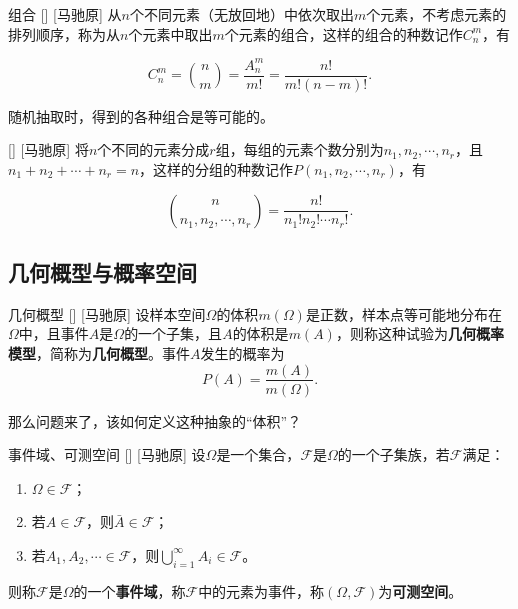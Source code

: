 \documentclass[UTF8]{ctexart}
\begin{document}
        \begin{xmp}
            []
            {组合}
            []
            [马驰原]
            从$n$个不同元素（无放回地）中依次取出$m$个元素，不考虑元素的排列顺序，称为从$n$个元素中取出$m$个元素的组合，这样的组合的种数记作$C_n^m$，有
            
            \[C_n^m=\binom{n}{m}=\frac{A_n^m}{m!}=\frac{n!}{m!(n-m)!}.\]
            
            随机抽取时，得到的各种组合是等可能的。
        \end{xmp}

        \begin{xmp}
            []
            {}
            []
            [马驰原]
            将$n$个不同的元素分成$r$组，每组的元素个数分别为$n_1,n_2,\cdots,n_r$，且$n_1+n_2+\cdots+n_r=n$，这样的分组的种数记作$P(n_1,n_2,\cdots,n_r)$，有
            
            \[\binom{n}{n_1,n_2,\cdots,n_r}=\frac{n!}{n_1!n_2!\cdots n_r!}.\]
        \end{xmp}
    
    \subsection{几何概型与概率空间}
        
        \begin{dfn}
            []
            {几何概型}
            []
            [马驰原]
            设样本空间$\Omega$的体积$m(\Omega)$是正数，样本点等可能地分布在$\Omega$中，且事件$A$是$\Omega$的一个子集，且$A$的体积是$m(A)$，则称这种试验为\textbf{几何概率模型}，简称为\textbf{几何概型}。事件$A$发生的概率为\[P(A)=\frac{m(A)}{m(\Omega)}.\]
        \end{dfn}

        那么问题来了，该如何定义这种抽象的“体积”？

        \begin{dfn}
            []
            {事件域、可测空间}
            []
            [马驰原]
            设$\Omega$是一个集合，$\mathcal{F}$是$\Omega$的一个子集族，若$\mathcal{F}$满足：

            \begin{enumerate}
                \item $\Omega\in\mathcal{F}$；
                \item 若$A\in\mathcal{F}$，则$\bar{A}\in\mathcal{F}$；
                \item 若$A_1,A_2,\cdots\in\mathcal{F}$，则$\bigcup_{i=1}^{\infty}A_i\in\mathcal{F}$。
            \end{enumerate}

            则称$\mathcal{F}$是$\Omega$的一个\textbf{事件域}，称$\mathcal{F}$中的元素为事件，称$(\Omega,\mathcal{F})$为\textbf{可测空间}。

        \end{dfn}
\end{document}
